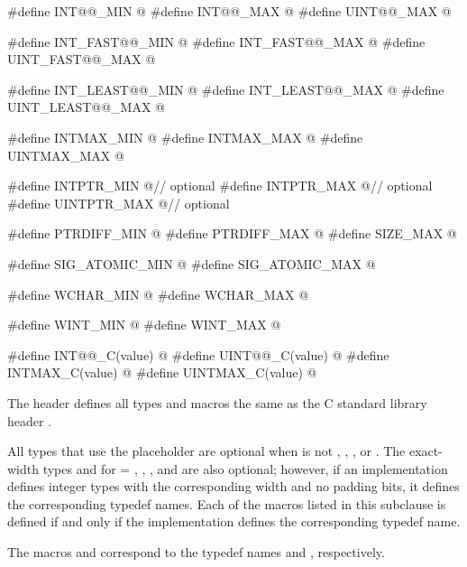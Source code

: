 \begin{codeblock}
#define INT@@_MIN         @\seebelow@
#define INT@@_MAX         @\seebelow@
#define UINT@@_MAX        @\seebelow@

#define INT_FAST@@_MIN    @\seebelow@
#define INT_FAST@@_MAX    @\seebelow@
#define UINT_FAST@@_MAX   @\seebelow@

#define INT_LEAST@@_MIN   @\seebelow@
#define INT_LEAST@@_MAX   @\seebelow@
#define UINT_LEAST@@_MAX  @\seebelow@

#define INTMAX_MIN       @\seebelow@
#define INTMAX_MAX       @\seebelow@
#define UINTMAX_MAX      @\seebelow@

#define INTPTR_MIN       @\seebelow@              // optional
#define INTPTR_MAX       @\seebelow@              // optional
#define UINTPTR_MAX      @\seebelow@              // optional

#define PTRDIFF_MIN      @\seebelow@
#define PTRDIFF_MAX      @\seebelow@
#define SIZE_MAX         @\seebelow@

#define SIG_ATOMIC_MIN   @\seebelow@
#define SIG_ATOMIC_MAX   @\seebelow@

#define WCHAR_MIN        @\seebelow@
#define WCHAR_MAX        @\seebelow@

#define WINT_MIN         @\seebelow@
#define WINT_MAX         @\seebelow@

#define INT@@_C(value)    @\seebelow@
#define UINT@@_C(value)   @\seebelow@
#define INTMAX_C(value)  @\seebelow@
#define UINTMAX_C(value) @\seebelow@
\end{codeblock}

\pnum
The header defines all types and macros the same as
the C standard library header .


\pnum
All types that use the placeholder 
are optional when 
is not , , , or .
The exact-width types
 and 
for  = , , , and 
are also optional;
however, if an implementation defines integer types
with the corresponding width and no padding bits,
it defines the corresponding typedef names.
Each of the macros listed in this subclause
is defined if and only if
the implementation defines the corresponding typedef name.
\begin{note}
The macros  and 
correspond to the typedef names
 and ,
respectively.
\end{note}

